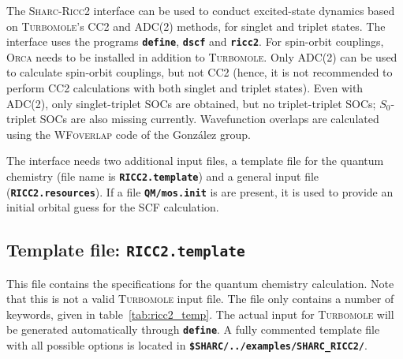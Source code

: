 \documentclass[a4paper,10pt,DIV=15,openany]{scrbook}
\newcommand{\sharc}{\textsc{Sharc}}
\newcommand{\ttt}[1]{\textbf{\texttt{#1}}}
\begin{document}
The \sharc-\textsc{Ricc2} interface can be used to conduct excited-state dynamics based on \textsc{Turbomole}'s CC2 and ADC(2) methods, for singlet and triplet states.
The interface uses the programs \ttt{define}, \ttt{dscf} and \ttt{ricc2}.
For spin-orbit couplings, \textsc{Orca} needs to be installed in addition to \textsc{Turbomole}.
Only ADC(2) can be used to calculate spin-orbit couplings, but not CC2 (hence, it is not recommended to perform CC2 calculations with both singlet and triplet states).
Even with ADC(2), only singlet-triplet SOCs are obtained, but no triplet-triplet SOCs; $S_0$-triplet SOCs are also missing currently.
Wavefunction overlaps are calculated using the \textsc{WFoverlap} code of the Gonz\'alez group.\cite{Plasser2016JCTC}

The interface needs two additional input files, a template file for the quantum chemistry (file name is \ttt{RICC2.template}) and a general input file (\ttt{RICC2.resources}). 
If a file \ttt{QM/mos.init} is are present, it is used to provide an initial orbital guess for the SCF calculation.


\subsection{Template file: \ttt{RICC2.template}}

This file contains the specifications for the quantum chemistry calculation. Note that this is not a valid \textsc{Turbomole} input file. The file only contains a number of keywords, given in table~\ref{tab:ricc2_temp}. The actual input for \textsc{Turbomole} will be generated automatically through \ttt{define}.
A fully commented template file with all possible options is located in \ttt{\$SHARC/../examples/SHARC\_RICC2/}.
\end{document}
